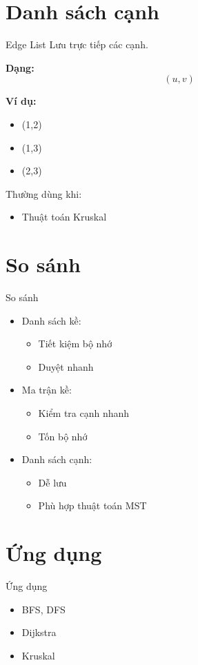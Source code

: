 \documentclass{beamer}
\begin{document}
\section{Danh sách cạnh}
\begin{frame}{Edge List}
Lưu trực tiếp các cạnh.

\textbf{Dạng:}
\[
(u, v)
\]

\textbf{Ví dụ:}
\begin{itemize}
    \item (1,2)
    \item (1,3)
    \item (2,3)
\end{itemize}

Thường dùng khi:
\begin{itemize}
    \item Thuật toán Kruskal
\end{itemize}
\end{frame}

\section{So sánh}
\begin{frame}{So sánh}
\begin{itemize}
\item Danh sách kề:
    \begin{itemize}
        \item Tiết kiệm bộ nhớ
        \item Duyệt nhanh
    \end{itemize}

    \item Ma trận kề:
    \begin{itemize}
        \item Kiểm tra cạnh nhanh
        \item Tốn bộ nhớ
    \end{itemize}

    \item Danh sách cạnh:
    \begin{itemize}
        \item Dễ lưu
        \item Phù hợp thuật toán MST
    \end{itemize}
\end{itemize}
\end{frame}

\section{Ứng dụng}
\begin{frame}{Ứng dụng}
\begin{itemize}
    \item BFS, DFS
    \item Dijkstra
    \item Kruskal
\end{itemize}
\end{frame}
\end{document}

